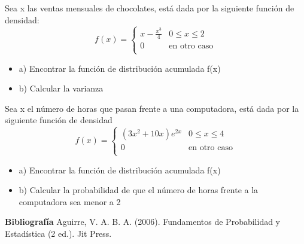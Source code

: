 \documentclass{../oxmathproblems}
\begin{document}
\begin{questions}
\miquestion Sea x las ventas mensuales de chocolates, está dada por la siguiente función de densidad: 
\[ 
f(x) = 
     \begin{cases}
       x- \frac{x^3}{4}  & 0  \leq x  \leq 2 \\
       0 & \text{en otro caso} \\
     \end{cases}
\]
$$$$
\begin{itemize}
\item  a) Encontrar la función de distribución acumulada f(x)  
\item  b) Calcular la varianza
\end{itemize}




\miquestion Sea x el número de horas que pasan frente a una computadora, está dada por la siguiente función de densidad 
\[ 
f(x) = 
     \begin{cases}
        (3x^2 + 10x)e^{2x}  & 0  \leq x  \leq 4 \\
       0 & \text{en otro caso} \\
     \end{cases}
\]
$$$$
\begin{itemize}
\item  a) Encontrar la función de distribución acumulada  f(x)  
\item  b) Calcular la probabilidad de que el número de horas frente a la computadora sea menor a 2
\end{itemize}



\end{questions}



\textbf{Bibliografía}
Aguirre, V. A. B. A. (2006). Fundamentos de Probabilidad y Estadística (2 ed.). Jit Press.
\end{document}

